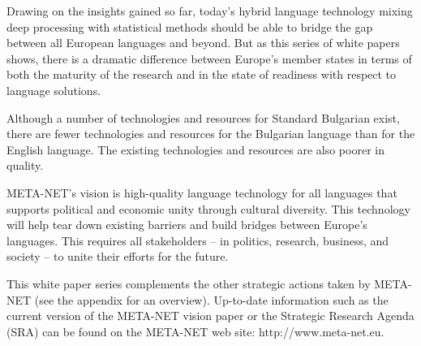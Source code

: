 \begin{multicols}{2}

  Drawing on the insights gained so far, today’s hybrid language technology mixing deep processing with statistical methods should be able to bridge the gap between all European languages and beyond. But as this series of white papers shows, there is a dramatic difference between Europe’s
  member states in terms of both the maturity of the research and in the state of readiness with respect to language solutions.

  Although a number of technologies and resources for Standard Bulgarian exist, there are fewer technologies and resources for the Bulgarian language than for the English language. The existing technologies and resources are also poorer in quality.

  META-NET’s vision is high-quality language technology for all languages that supports political and economic unity through cultural diversity. This technology will help tear down existing barriers and build bridges between Europe’s languages. This requires all stakeholders -- in politics, research, business, and society -- to unite their efforts for the future.

  This white paper series complements the other strategic actions taken by META-NET (see the appendix for an overview). Up-to-date information such as the current version of the META-NET vision paper \cite{Meta1} or the Strategic Research Agenda (SRA) can be found on the META-NET web site: http://www.meta-net.eu.
  \end{multicols}

  \clearpage


